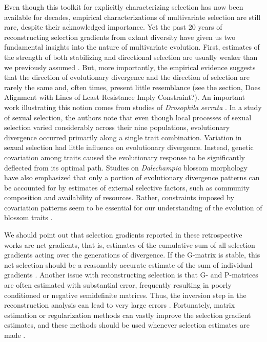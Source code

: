 \begin{refsection}
Even though this toolkit for explicitly characterizing selection has now
been available for decades, empirical characterizations of multivariate
selection are still rare, despite their acknowledged importance. Yet the
past 20 years of reconstructing selection gradients from extant
diversity have given us two fundamental insights into the nature of
multivariate evolution. First, estimates of the strength of both
stabilizing and directional selection are usually weaker than we
previously assumed \parencite{Kingsolver2001-yq, Kingsolver2012-yv}. But, more importantly,
the empirical evidence suggests that the direction of evolutionary
divergence and the direction of selection are rarely the same and, often
times, present little resemblance (see the section, Does Alignment with
Lines of Least Resistance Imply Constraint?). An important work
illustrating this notion comes from studies of \emph{Drosophila serrata}
\parencite{Chenoweth2010-dg}. In a study of
sexual selection, the authors note that even though local processes of
sexual selection varied considerably across their nine populations,
evolutionary divergence occurred primarily along a single trait
combination. Variation in sexual selection had little influence on
evolutionary divergence. Instead, genetic covariation among traits
caused the evolutionary response to be significantly deflected from its
optimal path. Studies on \emph{Dalechampia} blossom morphology have also
emphasized that only a portion of evolutionary divergence patterns can
be accounted for by estimates of external selective factors, such as
community composition and availability of resources. Rather, constraints
imposed by covariation patterns seem to be essential for our
understanding of the evolution of blossom traits \parencite{Bolstad2014-oi, Hansen2006-yc}.

We should point out that selection gradients reported in these
retrospective works are net gradients, that is, estimates of the
cumulative sum of all selection gradients acting over the generations of
divergence. If the G-matrix is stable, this net selection should be a
reasonably accurate estimate of the sum of individual gradients \parencite{Jones2004-be}. 
Another issue
with reconstructing selection is that G- and P-matrices are often
estimated with substantial error, frequently resulting in poorly
conditioned or negative semidefinite matrices. Thus, the inversion step
in the reconstruction analysis can lead to very large errors \parencite{Marroig2012-jd}. 
Fortunately,
matrix estimation or regularization methods can vastly improve the
selection gradient estimates, and these methods should be used whenever
selection estimates are made \parencite{Marroig2012-jd, Schafer2005-ld}.


\end{refsection}
